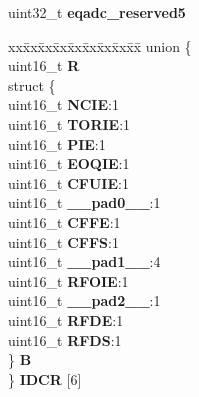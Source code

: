 \begin{DoxyCompactItemize}
\begin{tabbing}
\end{tabbing}\item 
\mbox{\label{structEQADC__tag_a2a9b06f9ad3ca8c0285f0a356fb9b890}} 
uint32\+\_\+t {\bfseries eqadc\+\_\+reserved5}
\item 
\mbox{\label{structEQADC__tag_a5e4f75d675c3a70a0db6adc74a03176a}} 
\begin{tabbing}
xx\=xx\=xx\=xx\=xx\=xx\=xx\=xx\=xx\=\kill
union \{\\
\>uint16\_t {\bfseries R}\\
\>struct \{\\
\>\>uint16\_t {\bfseries NCIE}:1\\
\>\>uint16\_t {\bfseries TORIE}:1\\
\>\>uint16\_t {\bfseries PIE}:1\\
\>\>uint16\_t {\bfseries EOQIE}:1\\
\>\>uint16\_t {\bfseries CFUIE}:1\\
\>\>uint16\_t {\bfseries \_\_pad0\_\_}:1\\
\>\>uint16\_t {\bfseries CFFE}:1\\
\>\>uint16\_t {\bfseries CFFS}:1\\
\>\>uint16\_t {\bfseries \_\_pad1\_\_}:4\\
\>\>uint16\_t {\bfseries RFOIE}:1\\
\>\>uint16\_t {\bfseries \_\_pad2\_\_}:1\\
\>\>uint16\_t {\bfseries RFDE}:1\\
\>\>uint16\_t {\bfseries RFDS}:1\\
\>\} {\bfseries B}\\
\} {\bfseries IDCR} \mbox{[}6\mbox{]}\\


\end{tabbing}
\end{DoxyCompactItemize}
